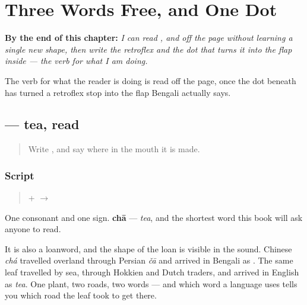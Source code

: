 
\chapter{Three Words Free, and One Dot}
\label{ch:bn-three-words-and-a-dot}

\begin{chapteropening}
\textbf{By the end of this chapter:} \emph{I can read ,  and  off the page without learning a single new shape, then write the retroflex  and the dot that turns it into the flap inside  — the verb for what I am doing.}

The verb for what the reader is doing is read off the page, once the dot beneath  has turned a retroflex stop into the flap Bengali actually says.
\end{chapteropening}

\section[\texorpdfstring{\bn{চা} (chā)}{চা (chā)}]{ — tea, read}

\label{lesson:BN-W04-chaa-read}



\begin{quote}
Write \textbf{}, and say where in the mouth it is made.
\end{quote}

\subsection*{Script}
\begin{quote}
\textbf{} + \textbf{} $\to$ \textbf{}
\end{quote}

One consonant and one sign. \textbf{chā} — \emph{tea}, and the shortest word this book will ask anyone to read.

It is also a loanword, and the shape of the loan is visible in the sound. Chinese \emph{chá} travelled overland through Persian \emph{čā} and arrived in Bengali as \textbf{}. The same leaf travelled by sea, through Hokkien and Dutch traders, and arrived in English as \emph{tea}. One plant, two roads, two words — and which word a language uses tells you which road the leaf took to get there.

